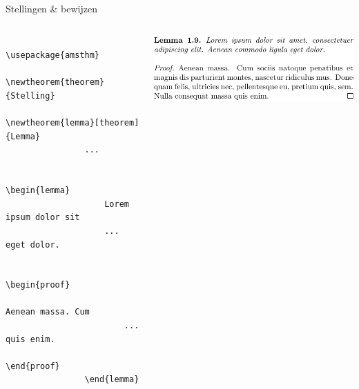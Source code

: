 \copyrightVincent

\begin{frame}[fragile]{Stellingen \& bewijzen}
    \begin{columns}
        \begin{column}{0.4\textwidth}
            \begin{verbatim}
                \usepackage{amsthm}
                \newtheorem{theorem}{Stelling}
                \newtheorem{lemma}[theorem]{Lemma}
                ...

                \begin{lemma}
                    Lorem ipsum dolor sit
                    ... eget dolor.
                    
                    \begin{proof}
                        Aenean massa. Cum
                        ... quis enim.
                    \end{proof}
                \end{lemma}
            \end{verbatim}
        \end{column}
        \begin{column}{0.4\textwidth}
            \includegraphics[width=\linewidth,height=0.8\textheight,keepaspectratio]{assets/mathLemmaProof.pdf}
        \end{column}
    \end{columns}
\end{frame}

